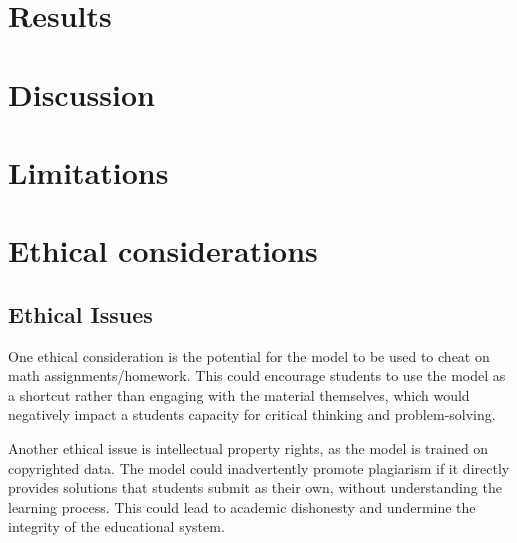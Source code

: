 \documentclass{article}
\begin{document}
\section{Results}


\section{Discussion}


\section{Limitations}

\section{Ethical considerations}



\subsection{Ethical Issues}
One ethical consideration is the potential for the model to be used to cheat on math assignments/homework. This could encourage students to use the model as a shortcut rather than engaging with the material themselves, which would negatively impact a students capacity for critical thinking and problem-solving. 

Another ethical issue is intellectual property rights, as the model is trained on copyrighted data. The model could inadvertently promote plagiarism if it directly provides solutions that students submit as their own, without understanding the learning process. This could lead to academic dishonesty and undermine the integrity of the educational system.
\end{document}
